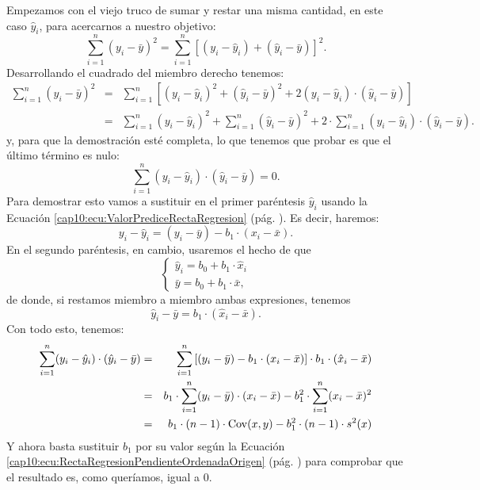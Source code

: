 Empezamos con  el viejo truco de sumar y restar una misma cantidad, en este caso $\hat y_i$,  para acercarnos a nuestro objetivo:
\[
    \displaystyle\sum_{i=1}^{n}(y_i-\bar y)^2 =
    \displaystyle\sum_{i=1}^{n}\left[(y_i - \hat y_i) + (\hat y_i - \bar y)\right]^2.
\]
Desarrollando el cuadrado del miembro derecho tenemos:
\begin{eqnarray*}
    \displaystyle\sum_{i=1}^{n}(y_i-\bar y)^2  & = &
       \displaystyle\sum_{i=1}^{n}\left[(y_i - \hat y_i)^2  +
    (\hat y_i - \bar y)^2 +
    2(y_i - \hat y_i)\cdot (\hat y_i - \bar y)
       \right]
    \\
    & = &
    \displaystyle\sum_{i=1}^{n}(y_i - \hat y_i)^2  +
    \displaystyle\sum_{i=1}^{n}(\hat y_i - \bar y)^2 +
    2\cdot\displaystyle\sum_{i=1}^{n} (y_i - \hat y_i)\cdot (\hat y_i - \bar y).
\end{eqnarray*}
y, para que la demostración esté completa, lo que tenemos que probar es que el último término es nulo:
\[
    \displaystyle\sum_{i=1}^{n} (y_i - \hat y_i)\cdot (\hat y_i - \bar y)=0.
\]
Para demostrar esto vamos a sustituir en el primer paréntesis $\hat y_i$ usando la Ecuación \ref{cap10:ecu:ValorPrediceRectaRegresion} (pág. \pageref{cap10:ecu:ValorPrediceRectaRegresion}). Es decir, haremos:
\[y_i-\hat y_i = (y_i - \bar y) - b_1\cdot (x_i-\bar x).\]
En el segundo paréntesis, en cambio, usaremos el hecho de que
\[
\begin{cases}
\hat y_i= b_0 + b_1\cdot \hat x_i\\
\bar y = b_0 + b_1\cdot \bar x,
\end{cases}
\]
de donde, si restamos miembro a miembro ambas expresiones, tenemos
\[\hat y_i - \bar y = b_1\cdot(\hat x_i - \bar x).\]
Con todo esto, tenemos:
\begin{eqnarray*}
    \displaystyle\sum_{i=1}^{n} (y_i - \hat y_i)\cdot (\hat y_i - \bar y)  & = &
     \displaystyle\sum_{i=1}^{n} \left[(y_i - \bar y) - b_1\cdot (x_i-\bar x)\right]\cdot b_1\cdot(\hat x_i - \bar x)
    \\
    & = &
    b_1\cdot \displaystyle\sum_{i=1}^{n} (y_i - \bar y)\cdot (x_i-\bar x)-
b_1^2\cdot \displaystyle\sum_{i=1}^{n} (x_i-\bar x)^2\\
    & = &
    b_1\cdot(n-1)\cdot \mathrm{Cov}(x,y) - b_1^2\cdot(n-1)\cdot s^2(x)
\end{eqnarray*}
Y ahora basta sustituir $b_1$ por su valor según la Ecuación \ref{cap10:ecu:RectaRegresionPendienteOrdenadaOrigen} (pág. \pageref{cap10:ecu:RectaRegresionPendienteOrdenadaOrigen}) para comprobar que el resultado es, como queríamos, igual a $0$.

